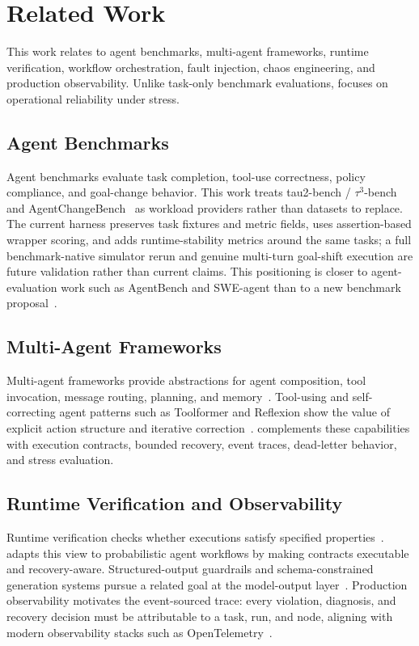 \section{Related Work}

This work relates to agent benchmarks, multi-agent frameworks, runtime verification, workflow orchestration, fault injection, chaos engineering, and production observability. Unlike task-only benchmark evaluations, \system focuses on operational reliability under stress.

\subsection{Agent Benchmarks}

Agent benchmarks evaluate task completion, tool-use correctness, policy compliance, and goal-change behavior. This work treats tau2-bench / \mbox{$\tau^3$}-bench and AgentChangeBench~\cite{tau2bench,agentchangebench} as workload providers rather than datasets to replace. The current harness preserves task fixtures and metric fields, uses assertion-based wrapper scoring, and adds runtime-stability metrics around the same tasks; a full benchmark-native simulator rerun and genuine multi-turn goal-shift execution are future validation rather than current claims. This positioning is closer to agent-evaluation work such as AgentBench and SWE-agent than to a new benchmark proposal~\cite{agentbench,sweagent}.

\subsection{Multi-Agent Frameworks}

Multi-agent frameworks provide abstractions for agent composition, tool invocation, message routing, planning, and memory~\cite{autogen,react,langgraph}. Tool-using and self-correcting agent patterns such as Toolformer and Reflexion show the value of explicit action structure and iterative correction~\cite{toolformer,reflexion}. \system complements these capabilities with execution contracts, bounded recovery, event traces, dead-letter behavior, and stress evaluation.

\subsection{Runtime Verification and Observability}

Runtime verification checks whether executions satisfy specified properties~\cite{runtimeverification}. \system adapts this view to probabilistic agent workflows by making contracts executable and recovery-aware. Structured-output guardrails and schema-constrained generation systems pursue a related goal at the model-output layer~\cite{guardrails,jsonformer}. Production observability motivates the event-sourced trace: every violation, diagnosis, and recovery decision must be attributable to a task, run, and node, aligning with modern observability stacks such as OpenTelemetry~\cite{opentelemetry}.

